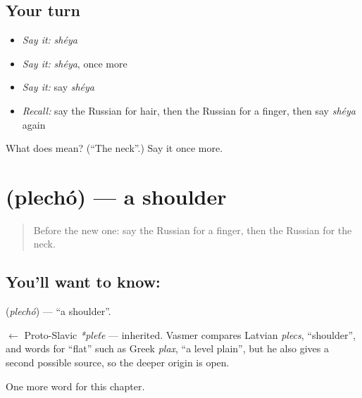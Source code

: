 \subsection*{Your turn}
\begin{itemize}
\raggedright
  \item \emph{Say it:} \emph{shéya}
  \item \emph{Say it:} \emph{shéya}, once more
  \item \emph{Say it:} say \emph{shéya}
  \item \emph{Recall:} say the Russian for hair, then the Russian for a finger, then say \emph{shéya} again
\end{itemize}

\begin{tcolorbox}[breakable,colback=teal!4,colframe=teal!35!black,title={Before you move on}]
What does  mean? (\textquotedblleft{}The neck\textquotedblright{}.) Say it once more.
\end{tcolorbox}
\section[\texorpdfstring{\ru{плечо} (plechó)}{плечо (plechó)}]{ (plechó) — a shoulder}

\label{lesson:RU-C30-shoulder}



\begin{quote}
Before the new one: say the Russian for a finger, then the Russian for the neck.
\end{quote}

\subsection*{You'll want to know: }
\textbf{} (\emph{plechó}) — \textquotedblleft{}a shoulder\textquotedblright{}.

\begin{cousinweb}
\textbf{} $\leftarrow$ Proto-Slavic \emph{*pleťe} — inherited. Vasmer compares Latvian \emph{plecs}, \textquotedblleft{}shoulder\textquotedblright{}, and words for \textquotedblleft{}flat\textquotedblright{} such as Greek \emph{plax}, \textquotedblleft{}a level plain\textquotedblright{}, but he also gives a second possible source, so the deeper origin is open.
\end{cousinweb}

\begin{grammarlens}[title={What you've built}]
One more word for this chapter.
\end{grammarlens}

